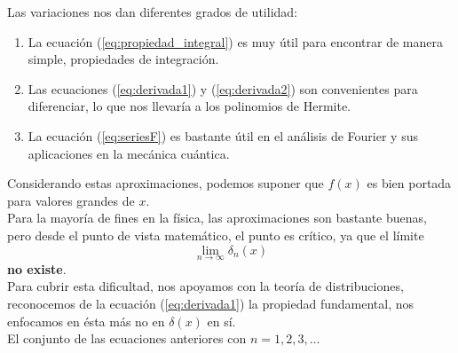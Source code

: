 Las variaciones nos dan diferentes grados de utilidad:
\begin{enumerate}
\item La ecuación (\ref{eq:propiedad_integral}) es muy útil para encontrar de manera simple, propiedades de integración.
\item Las ecuaciones (\ref{eq:derivada1}) y (\ref{eq:derivada2}) son convenientes para diferenciar, lo que nos llevaría a los polinomios de Hermite.
\item La ecuación (\ref{eq:seriesF}) es bastante útil en el análisis de Fourier y sus aplicaciones en la mecánica cuántica.
\end{enumerate}
Considerando estas aproximaciones, podemos suponer que $f(x)$ es bien portada para valores grandes de $x$.
\\
Para la mayoría de fines en la física, las aproximaciones son bastante buenas, pero desde el punto de vista matemático, el punto es crítico, ya que el límite
\[ \lim_{n \to \infty} \delta_{n} (x) \]
\textbf{no existe}.
\\
Para cubrir esta dificultad, nos apoyamos con la teoría de distribuciones, reconocemos de la ecuación (\ref{eq:derivada1}) la propiedad fundamental, nos enfocamos en ésta más no en $\delta(x)$ en sí.
\\
El conjunto de las ecuaciones anteriores con $n=1,2,3,\ldots$
